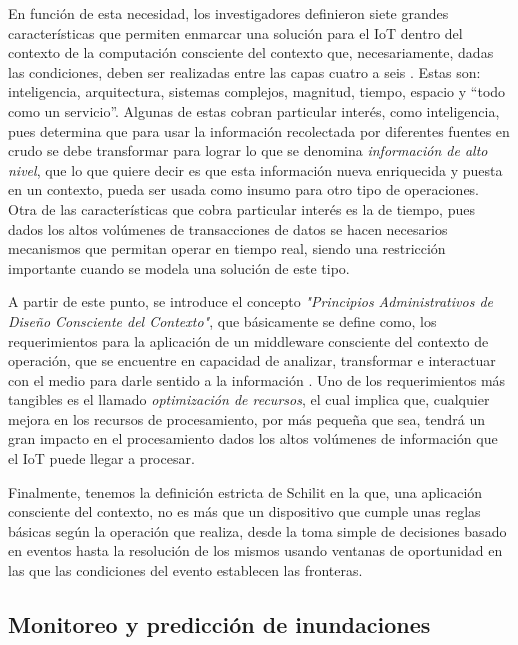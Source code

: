En función de esta necesidad, los investigadores definieron siete grandes características que permiten enmarcar una solución para el IoT dentro del contexto de la computación consciente del contexto que, necesariamente, dadas las condiciones, deben ser realizadas entre las capas cuatro a seis \citep{sundmaeker2010vision}. Estas son: inteligencia, arquitectura, sistemas complejos, magnitud, tiempo, espacio y ``todo como un servicio''. Algunas de estas cobran particular interés, como inteligencia, pues determina que para usar la información recolectada por diferentes fuentes en crudo se debe transformar para lograr lo que se denomina \textit{información de alto nivel}, que lo que quiere decir es que esta información nueva enriquecida y puesta en un contexto, pueda ser usada como insumo para otro tipo de operaciones. Otra de las características que cobra particular interés es la de tiempo, pues dados los altos volúmenes de transacciones de datos se hacen necesarios mecanismos que permitan operar en tiempo real, siendo una restricción importante cuando se modela una solución de este tipo. 
%
%

A partir de este punto, se introduce el concepto \textit{"Principios Administrativos de Diseño Consciente del Contexto"}, que básicamente se define como, los requerimientos para la aplicación de un middleware consciente del contexto de operación, que se encuentre en capacidad de analizar, transformar e interactuar con el medio para darle sentido a la información \citep{martin2010automatic,ramparany2007open,bernardos2008data}. Uno de los requerimientos más tangibles es el llamado \textit{optimización de recursos}, el cual implica que, cualquier mejora en los recursos de procesamiento, por más pequeña que sea, tendrá un gran impacto en el procesamiento dados los altos volúmenes de información que el IoT puede llegar a procesar.

Finalmente, tenemos la definición estricta de Schilit \citep{schilit1994context} en la que, una aplicación consciente del contexto, no es más que un dispositivo que cumple unas reglas básicas según la operación que realiza, desde la toma simple de decisiones basado en eventos hasta la resolución de los mismos usando ventanas de oportunidad en las que las condiciones del evento establecen las fronteras. 

\subsection{Monitoreo y predicción de inundaciones}


